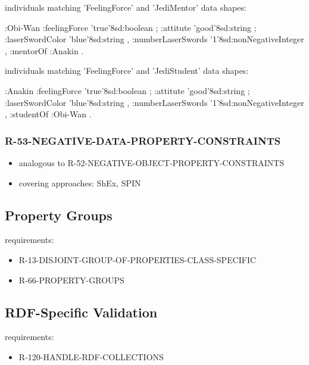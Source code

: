 \documentclass{llncs}
\begin{document}
individuals matching 'FeelingForce' and 'JediMentor' data shapes:

\begin{ex}
:Obi-Wan 
    :feelingForce 'true'^^xsd:boolean ;
    :attitute 'good'^^xsd:string ;
    :laserSwordColor 'blue'^^xsd:string ,
    :numberLaserSwords '1'^^xsd:nonNegativeInteger ,
    :mentorOf :Anakin .
\end{ex}

individuals matching 'FeelingForce' and 'JediStudent' data shapes:

\begin{ex}
:Anakin 
    :feelingForce 'true'^^xsd:boolean ;
    :attitute 'good'^^xsd:string ;
    :laserSwordColor 'blue'^^xsd:string ,
    :numberLaserSwords '1'^^xsd:nonNegativeInteger ,
    :studentOf :Obi-Wan . 
\end{ex}

\subsubsection{R-53-NEGATIVE-DATA-PROPERTY-CONSTRAINTS}

\begin{itemize}
	\item analogous to R-52-NEGATIVE-OBJECT-PROPERTY-CONSTRAINTS
	\item covering approaches: ShEx, SPIN
\end{itemize}

\subsection{Property Groups}

requirements:

\begin{itemize}
	\item R-13-DISJOINT-GROUP-OF-PROPERTIES-CLASS-SPECIFIC
	\item R-66-PROPERTY-GROUPS
\end{itemize}

\subsection{RDF-Specific Validation}

requirements:

\begin{itemize}
	\item R-120-HANDLE-RDF-COLLECTIONS
\end{itemize}
\end{document}
